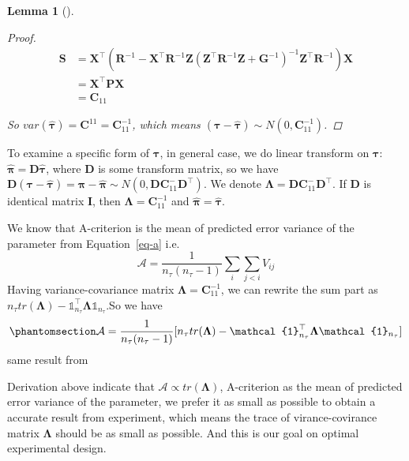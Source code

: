 \documentclass[
  a4paper,
  oneside,
  openany,
  12pt,
  onecolumn]{book}
\theoremstyle{definition}
\theoremstyle{definition}
\theoremstyle{plain}
\newtheorem{lemma}{Lemma}[chapter]
\theoremstyle{remark}
\begin{document}
\begin{lemma}[]
\begin{proof}
\[\begin{aligned}
\boldsymbol{S}
&=\boldsymbol{X}^\top(\boldsymbol{R}^{-1} - \boldsymbol{X}^\top \boldsymbol{R}^{-1} \boldsymbol{Z} (\boldsymbol{Z}^\top \boldsymbol{R}^{-1} \boldsymbol{Z} + \boldsymbol{G}^{-1})^{-1} \boldsymbol{Z}^\top \boldsymbol{R}^{-1})\boldsymbol{X}\\
&=\boldsymbol{X}^\top\boldsymbol{P}\boldsymbol{X}\\
&=\boldsymbol{C}_{11}
\end{aligned}\]

So
\(var(\hat{\boldsymbol{\tau}})=\boldsymbol{C}^{11}=\boldsymbol{C}_{11}^{-1}\),
which means
\((\boldsymbol{\tau}-\hat{\boldsymbol{\tau}})\sim N(0,\boldsymbol{C}_{11}^{-1})\).
\end{proof}

\end{lemma}

To examine a specific form of \(\boldsymbol{\tau}\), in general case, we
do linear transform on \(\boldsymbol{\tau}\):
\(\hat{\boldsymbol{\pi}}=\boldsymbol{D}\hat{\boldsymbol{\tau}}\), where
\(\boldsymbol{D}\) is some transform matrix, so we have
\(\boldsymbol{D}(\boldsymbol{\tau}-\hat{\boldsymbol{\tau}})=\boldsymbol{\pi}-\hat{\boldsymbol{\pi}}\sim N(0,\boldsymbol{D}\boldsymbol{C}_{11}^{-}\boldsymbol{D}^\top)\).
We denote
\(\boldsymbol{\Lambda}=\boldsymbol{D}\boldsymbol{C}_{11}^{-}\boldsymbol{D}^\top\).
If \(\boldsymbol{D}\) is identical matrix \(\boldsymbol{I}\), then
\(\boldsymbol{\Lambda}=\boldsymbol{C}_{11}^{-1}\) and
\(\hat{\boldsymbol{\pi}}=\hat{\boldsymbol{\tau}}\).

We know that A-criterion is the mean of predicted error variance of the
parameter from Equation~\ref{eq-a} i.e.~ \[
\mathcal{A}=\frac{1}{n_{\tau}(n_{\tau}-1)}\sum_{i}\sum_{j<i}V_{ij}
\] Having variance-covariance matrix
\(\boldsymbol{\Lambda}=\boldsymbol{C}_{11}^{-1}\), we can rewrite the
sum part as
\(n_{\tau}tr(\boldsymbol{\Lambda})-\mathbb{1}_{n_{\tau}}^\top\boldsymbol{\Lambda}\mathbb{1}_{n_{\tau}}\).So
we have \begin{equation}\phantomsection\label{eq-an}{
\mathcal{A}=\frac{1}{n_{\tau}(n_{\tau}-1)}[n_{\tau}tr(\boldsymbol{\Lambda})-\mathcal{1}_{n_{\tau}}^\top\boldsymbol{\Lambda}\mathcal{1}_{n_{\tau}}]
}\end{equation} same result from \citet{butler2013model}

Derivation above indicate that
\(\mathcal{A}\propto tr(\boldsymbol{\Lambda})\), A-criterion as the mean
of predicted error variance of the parameter, we prefer it as small as
possible to obtain a accurate result from experiment, which means the
trace of virance-covirance matrix \(\boldsymbol{\Lambda}\) should be as
small as possible. And this is our goal on optimal experimental design.
\end{document}
